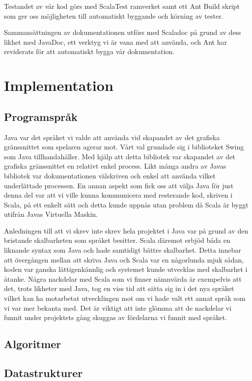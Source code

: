 \documentclass[a4paper]{article}
\begin{document}
Testandet av vår kod görs med ScalaTest ramverket samt ett Ant Build skript som ger oss möjligheten till automatiskt byggande och körning av tester.

Sammansättningen av dokumentationen utförs med Scaladoc på grund av dess likhet med JavaDoc, ett verktyg vi är vana med att använda, och Ant har reviderats för att automatiskt 
bygga vår dokumentation.

\section{Implementation}

\subsection{Programspråk}
Java var det språket vi valde att använda vid skapandet av det grafiska gränssnittet som spelaren agerar mot. Vårt val grundade sig i biblioteket Swing som Java tillhandahåller. 
Med hjälp att detta bibliotek var skapandet av det grafiska gränssnittet en relativt enkel process. Likt många andra av Javas bibliotek var dokumentationen välskriven och enkel 
att använda vilket underlättade processen. En annan aspekt som fick oss att välja Java för just denna del var att vi ville kunna kommunicera med resterande kod, skriven i Scala, 
på ett enkelt sätt och detta kunde uppnås utan problem då Scala är byggt utifrån Javas Virtuella Maskin. 

Anledningen till att vi skrev inte skrev hela projektet i Java var på grund av den bristande skalbarheten som språket besitter. Scala däremot erbjöd båda en liknande syntax som 
Java och hade samtidigt bättre skalbarhet. Detta innebar att övergången mellan att skriva Java och Scala var en någorlunda mjuk sådan, koden var ganska lättigenkännlig och systemet 
kunde utvecklas med skalbarhet i åtanke. Några nackdelar med Scala som vi finner nämnvärda är exempelvis att det, trots likheter med Java, tog en viss tid att sätta sig in i det nya 
språket vilket kan ha motarbetat utvecklingen mot om vi hade valt ett annat språk som vi var mer bekanta med. Det är viktigt att inte glömma att de nackdelar vi funnit under 
projektets gång skuggas av fördelarna vi funnit med språket.

\subsection{Algoritmer}

\subsection{Datastrukturer}
\end{document}
